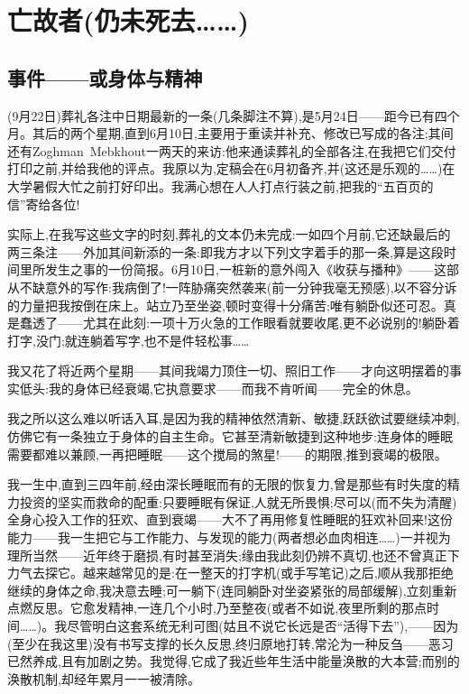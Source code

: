 \chapter{亡故者(仍未死去……)}

\section{事件——或身体与精神}


\dmark{}(9月22日)葬礼各注中日期最新的一条(几条脚注不算),是5月24日——距今已有四个月。其后的两个星期,直到6月10日,主要用于重读并补充、修改已写成的各注;其间还有Zoghman~Mebkhout一两天的来访:他来通读葬礼的全部各注,在我把它们交付打印之前,并给我他的评点。我原以为,定稿会在6月初备齐,并(这还是乐观的……)在大学暑假大忙之前打好印出。我满心想在人人打点行装之前,把我的“五百页的信”寄给各位!

实际上,在我写这些文字的时刻,葬礼的文本仍未完成:一如四个月前,它还缺最后的两三条注——外加其间新添的一条:即我方才以下列文字着手的那一条,算是这段时间里所发生之事的一份简报。6月10日,一桩新的意外闯入《收获与播种》——这部从不缺意外的写作:我病倒了!一阵胁痛突然袭来(前一分钟我毫无预感),以不容分诉的力量把我按倒在床上。站立乃至坐姿,顿时变得十分痛苦;唯有躺卧似还可忍。真是蠢透了——尤其在此刻:一项十万火急的工作眼看就要收尾,更不必说别的!躺卧着打字,没门;就连躺着写字,也不是件轻松事……

我又花了将近两个星期——其间我竭力顶住一切、照旧工作——才向这明摆着的事实低头:我的身体已经衰竭,它执意要求——而我不肯听闻——完全的休息。

我之所以这么难以听话入耳,是因为我的精神依然清新、敏捷,跃跃欲试要继续冲刺,仿佛它有一条独立于身体的自主生命。它甚至清新敏捷到这种地步:连身体的睡眠需要都难以兼顾,一再把睡眠——这个搅局的煞星!——的期限,推到衰竭的极限。

我一生中,直到三四年前,经由深长睡眠而有的无限的恢复力,曾是那些有时失度的精力投资的坚实而救命的配重:只要睡眠有保证,人就无所畏惧;尽可以(而不失为清醒)全身心投入工作的狂欢、直到衰竭——大不了再用修复性睡眠的狂欢补回来!这份能力——我一生把它与工作能力、与发现的能力(两者想必血肉相连……)一并视为理所当然——近年终于磨损,有时甚至消失;缘由我此刻仍辨不真切,也还不曾真正下力气去探它。越来越常见的是:在一整天的打字机(或手写笔记)之后,顺从我那拒绝继续的身体之命,我决意去睡;可一躺下(连同躺卧对坐姿紧张的局部缓解),立刻重新点燃反思。它愈发精神,一连几个小时,乃至整夜(或者不如说,夜里所剩的那点时间……)。我尽管明白这套系统无利可图(姑且不说它长远是否“活得下去”),——因为(至少在我这里)没有书写支撑的长久反思,终归原地打转,常沦为一种反刍——恶习已然养成,且有加剧之势。我觉得,它成了我近些年生活中能量涣散的大本营;而别的涣散机制,却经年累月一一被清除。

